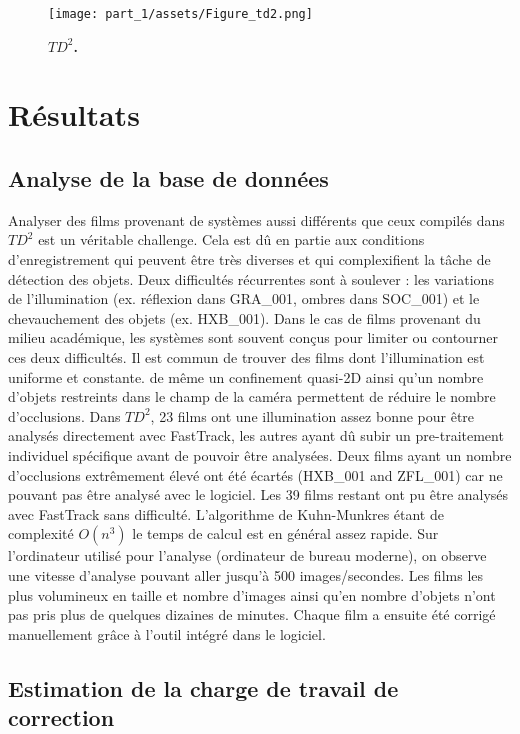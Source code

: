 	\begin{figure}[h]
    \centering
    \texttt{[image: part\_1/assets/Figure\_td2.png]}    
    \caption{\textbf{$TD^2$.}}
    \label{part_1:fig_5}
    \end{figure}


\chapter{Résultats}

	\section{Analyse de la base de données}

  Analyser des films provenant de systèmes aussi différents que ceux compilés dans $TD^2$ est un véritable challenge. Cela est dû en partie aux conditions d'enregistrement qui peuvent être très diverses et qui complexifient la tâche de détection des objets. Deux difficultés récurrentes sont à soulever : les variations de l'illumination (ex. réflexion dans GRA\_001, ombres dans SOC\_001) et le chevauchement des objets (ex. HXB\_001).
  Dans le cas de films provenant du milieu académique, les systèmes sont souvent conçus pour limiter ou contourner ces deux difficultés. Il est commun de trouver des films dont l'illumination est uniforme et constante. de même un confinement quasi-2D ainsi qu'un nombre d'objets restreints dans le champ de la caméra permettent de réduire le nombre d'occlusions.
  Dans $TD^2$, 23 films ont une illumination assez bonne pour être analysés directement avec FastTrack, les autres ayant dû subir un pre-traitement individuel spécifique avant de pouvoir être analysées. Deux films ayant un nombre d'occlusions extrêmement élevé ont été écartés (HXB\_001 and ZFL\_001) car ne pouvant pas être analysé avec le logiciel.
  Les 39 films restant ont pu être analysés avec FastTrack sans difficulté. L'algorithme de Kuhn-Munkres étant de complexité $O(n^3)$ le temps de calcul est en général assez rapide. Sur l'ordinateur utilisé pour l'analyse (ordinateur de bureau moderne), on observe une vitesse d'analyse pouvant aller jusqu’à 500 images/secondes. Les films les plus volumineux en taille et nombre d'images ainsi qu'en nombre d'objets n'ont pas pris plus de quelques dizaines de minutes. Chaque film a ensuite été corrigé manuellement grâce à l'outil intégré dans le logiciel.
	
	\section{Estimation de la charge de travail de correction}
	
